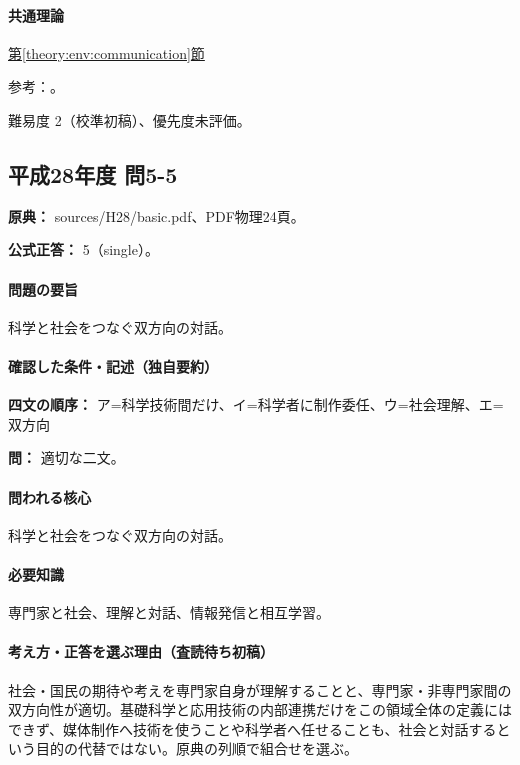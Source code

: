 \paragraph{共通理論} \hyperref[theory:env:communication]{第\ref*{theory:env:communication}節}

\par 参考：\cite{env58_communication}。

\par 難易度 2（校準初稿）、優先度未評価。

\subsection{平成28年度 問5-5}
\label{q:h28-reg-basic-5-5}

\noindent\textbf{原典：} sources/H28/basic.pdf、PDF物理24頁。

\textbf{公式正答：} 5（single）。

\paragraph{問題の要旨} 科学と社会をつなぐ双方向の対話。

\paragraph{確認した条件・記述（独自要約）}\mbox{}\par

\noindent\textbf{四文の順序：} ア=科学技術間だけ、イ=科学者に制作委任、ウ=社会理解、エ=双方向\par

\noindent\textbf{問：} 適切な二文。\par

\paragraph{問われる核心} 科学と社会をつなぐ双方向の対話。

\paragraph{必要知識} 専門家と社会、理解と対話、情報発信と相互学習。

\paragraph{考え方・正答を選ぶ理由（査読待ち初稿）} 社会・国民の期待や考えを専門家自身が理解することと、専門家・非専門家間の双方向性が適切。基礎科学と応用技術の内部連携だけをこの領域全体の定義にはできず、媒体制作へ技術を使うことや科学者へ任せることも、社会と対話するという目的の代替ではない。原典の列順で組合せを選ぶ。

